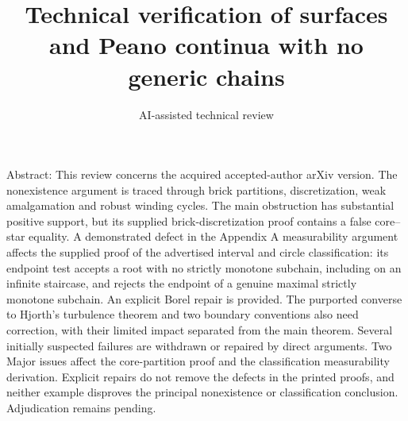 \documentclass[10pt]{article}
\title{Technical verification of
surfaces and Peano continua with no generic chains}
\author{AI-assisted technical review}
\date{}
\begin{document}
\maketitle
Abstract: This review concerns the acquired accepted-author arXiv version. The nonexistence argument is traced through brick partitions, discretization, weak amalgamation and robust winding cycles. The main obstruction has substantial positive support, but its supplied brick-discretization proof contains a false core–star equality. A demonstrated defect in the Appendix A measurability argument affects the supplied proof of the advertised interval and circle classification: its endpoint test accepts a root with no strictly monotone subchain, including on an infinite staircase, and rejects the endpoint of a genuine maximal strictly monotone subchain. An explicit Borel repair is provided. The purported converse to Hjorth’s turbulence theorem and two boundary conventions also need correction, with their limited impact separated from the main theorem. Several initially suspected failures are withdrawn or repaired by direct arguments. Two Major issues affect the core-partition proof and the classification measurability derivation. Explicit repairs do not remove the defects in the printed proofs, and neither example disproves the principal nonexistence or classification conclusion. Adjudication remains pending.\par
\end{document}
